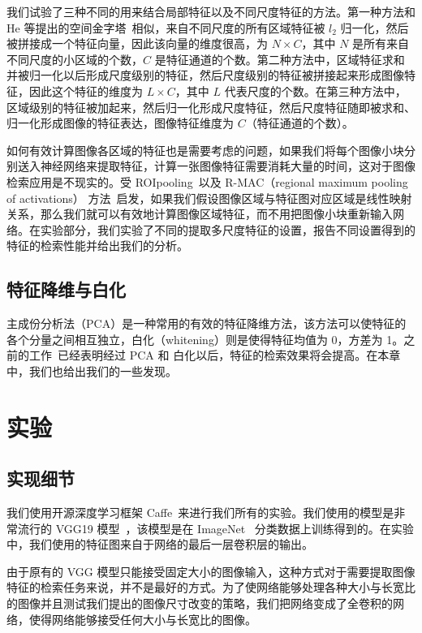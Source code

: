 我们试验了三种不同的用来结合局部特征以及不同尺度特征的方法。第一种方法和 He 等提出的空间金字塔~\cite{He2014SpatialPP}相似，来自不同尺度的所有区域特征被 $l_2$ 归一化，然后被拼接成一个特征向量，因此该向量的维度很高，为 $N\times C$，其中 $N$ 是所有来自不同尺度的小区域的个数，$C$ 是特征通道的个数。第二种方法中，区域特征求和并被归一化以后形成尺度级别的特征，然后尺度级别的特征被拼接起来形成图像特征，因此这个特征的维度为 $L \times C$，其中 $L$ 代表尺度的个数。在第三种方法中，区域级别的特征被加起来，然后归一化形成尺度特征，然后尺度特征随即被求和、归一化形成图像的特征表达，图像特征维度为 $C$（特征通道的个数）。

如何有效计算图像各区域的特征也是需要考虑的问题，如果我们将每个图像小块分别送入神经网络来提取特征，计算一张图像特征需要消耗大量的时间，这对于图像检索应用是不现实的。受 ROIpooling~\cite{Ren2017FasterRT}以及 R-MAC（regional maximum pooling of activations） 方法~\cite{Tolias2015ParticularOR}启发，如果我们假设图像区域与特征图对应区域是线性映射关系，那么我们就可以有效地计算图像区域特征，而不用把图像小块重新输入网络。在实验部分，我们实验了不同的提取多尺度特征的设置，报告不同设置得到的特征的检索性能并给出我们的分析。

\subsection{特征降维与白化}
主成份分析法（PCA）是一种常用的有效的特征降维方法，该方法可以使特征的各个分量之间相互独立，白化（whitening）则是使得特征均值为 0，方差为 1。之前的工作~\cite{Babenko2014NeuralCF}已经表明经过 PCA 和 白化以后，特征的检索效果将会提高。在本章中，我们也给出我们的一些发现。

\section{实验}\label{sec:mfc_experiment}
\subsection{实现细节}
我们使用开源深度学习框架 Caffe~\cite{Jia2014CaffeCA}来进行我们所有的实验。我们使用的模型是非常流行的 VGG19 模型~\cite{Simonyan2014VeryDC}，该模型是在 ImageNet~\cite{Russakovsky2015ImageNetLS} 分类数据上训练得到的。在实验中，我们使用的特征图来自于网络的最后一层卷积层的输出。

由于原有的 VGG 模型只能接受固定大小的图像输入，这种方式对于需要提取图像特征的检索任务来说，并不是最好的方式。为了使网络能够处理各种大小与长宽比的图像并且测试我们提出的图像尺寸改变的策略，我们把网络变成了全卷积的网络，使得网络能够接受任何大小与长宽比的图像。

